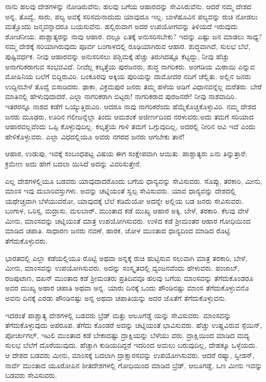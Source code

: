 ನಾನು ಹಲವು ದೇಶಗಳನ್ನು ನೋಡಿರುವೆನು; ಹಲವು ಬಗೆಯ ಆಹಾರವನ್ನು ಸೇವಿಸಿರುವೆನು. ಆದರೆ ನಮ್ಮ ದೇಶದ ಅನ್ನ, ತೊವ್ವೆ, ಸಾರು, ಪಲ್ಯ ಅವಕ್ಕೆ ಸರಿಸಮನಾದುದು ಯಾವುದೂ ಇಲ್ಲ. ಬಾಳೆಹೂವಿನ ಪಲ್ಯವನ್ನು ರುಚಿ ನೋಡಲು ಮತ್ತೊಂದು ಜನ್ಮವನ್ನಾದರೂ ಬಯಸುವೆನು. ಹಲ್ಲಿರುವಾಗ ಅದರ ಉಪಯೋಗವನ್ನು ತಿಳಿಯದೆ ಇರುವುದು ಶೋಚನೀಯ. ಪಾಶ್ಚಾತ್ಯರನ್ನು ನಾವು ಆಹಾರ. ದಲ್ಲೂ ಏತಕ್ಕೆ ಅನುಸರಿಸಬೇಕು? ಇದನ್ನು ಎಷ್ಟು ಜನ ಮಾಡಲು ಸಾಧ್ಯ? ನಮ್ಮ ದೇಶಕ್ಕೆ ಸರಿಯಾಗಿರುವುದು ಪೂರ್ವ ಬಂಗಾಳದಲ್ಲಿ ರೂಢಿಯಾಗಿರುವ ಆಹಾರ. ಶುದ್ಧವಾಗಿದೆ, ಸುಲಭ ಬೆಲೆ, ಪುಷ್ಟಿವರ್ಧಕ. ನೀವು ಆಹಾರವನ್ನು ಅನುಸರಿಸಲು ಪಶ್ಚಿಮಕ್ಕೆ ಹೆಚ್ಚು ತಿರುಗಿದಷ್ಟೂ ಕೆಟ್ಟದ್ದು, ನೀವು ಹೆಚ್ಚು ಅನಾಗರಿಕರಾಗುವ ಸಂಭವವಿದೆ. ನೀವೆಲ್ಲ ಕಲ್ಕತ್ತೆಯ ಪುರಜನರು, ಶುದ್ಧ ನಾಗರಿಕರು. ಅಂಗಡಿಯ ಮಿಠಾಯಿ ಎನ್ನುವ ಮೋಹಿನಿಯ ಬಲೆಗೆ ಬಿದ್ದಿರುವಿರಿ. ಬಂಕೂರವು ಅಕ್ಕಿಯ ಪುರಿಯನ್ನು ದಾಮೋದರ ನದಿಗೆ ಚೆಲ್ಲಿತು. ಅಲ್ಲಿನ ಜನರು ಉದ್ದಿನಬೇಳೆ ತೊವ್ವೆ ಬಿಸಾಡಿದರು. ಢಾಕಾ, ವಿಕ್ರಮಪುರ ಜನರು ತಮ್ಮ ಹಳೆಯ ಅಡಿಗೆ ವಿಧಾನವನ್ನೆಲ್ಲ ಮರೆತರು. ಬೇರೆ ಮಾತಿನಲ್ಲಿ ಹೇಳುವುದಾದರೆ, ಎಲ್ಲಾ ನಾಗರಿಕರಾಗಿ ಬಿಟ್ಟರು! ನಾಗರಿಕರಾದ ಪುರಜನರೇ! ನೀವು ನಾಶವಾದಿರಿ. ಇತರರನ್ನೂ ನಾಶದ ಕಡೆಗೆ ಒಯ್ಯುತ್ತಿರುವಿರಿ. ಆದರೂ ನಾವು ನಾಗರಿಕರೆಂದು ಹೆಮ್ಮೆಕೊಚ್ಚಿಕೊಳ್ಳುವಿರಿ. ನಮ್ಮ ದೇಶದ ಜನರು ಮೂಢರು, ಊರಿನ ಗಲೀಜನ್ನೆಲ್ಲಾ ತಿಂದು ಆಮಶಂಕೆ ಅಜೀರ್ಣದಿಂದ ನರಳುವರು.ಅದು ತಮಗೆ ಸರಿಯಾದ ಆಹಾರವಲ್ಲವೆಂದು ಒಪ್ಪಿ ಕೊಳ್ಳುವುದಿಲ್ಲ. ಕಲ್ಕತ್ತೆಯ ಗಾಳಿ ತಮಗೆ ಒಗ್ಗುವುದಿಲ್ಲ, ಅದರಲ್ಲಿ ನೀರಿನ ಆವಿ ಇದೆ ಎಂದು ಹೇಳಿಕೊಳ್ಳುವರು. ಎಲ್ಲಾ ವಿಧದಲ್ಲಿಯೂ ಅವರು ನಗರದ ಜನರು ಆಗಬೇಕು ತಾನೆ!

ಆಹಾರ, ಉಡುಪು, ಇವಕ್ಕೆ ಸಂಬಂಧಪಟ್ಟ ವಿಷಯ ಈಗ ಸಂಕ್ಷೇಪವಾಗಿ ಆಯಿತು. ಪಾಶ್ಚಾತ್ಯರು ಏನು ತಿನ್ನುತ್ತಾರೆ; ಕ್ರಮೇಣ ಅದು ಹೇಗೆ ಬದಲಾ ಯಿಸಿದೆ ಅದನ್ನು ವಿವರಿಸುತ್ತೇನೆ.

ಎಲ್ಲ ದೇಶಗಳಲ್ಲಿಯೂ ಬಡವರು ಯಾವುದಾದರೊಂದು ಬಗೆಯ ಧಾನ್ಯವನ್ನು ಸೇವಿಸುವರು. ಸೊಪ್ಪು, ತರಕಾರಿ, ಮೀನು, ಮಾಂಸ ಇವು ದುಬಾರಿವಸ್ತುಗಳು. ಅವನ್ನು ಚಟ್ನಿಯಂತೆ ಸ್ವಲ್ಪ ಸೇವಿಸುವರು. ಯಾವ ಧಾನ್ಯವನ್ನು ದೇಶದಲ್ಲಿ ಯಥೇಚ್ಚವಾಗಿ ಬೆಳೆಯುವರೋ, ಯಾವುದಕ್ಕೆ ಬೆಲೆ ಕಡಿಮೆಯೋ ಅದನ್ನೇ ಅಲ್ಲಿಯ ಬಡ ಜನರು ಸೇವಿಸುವರು. ಬಂಗಾಳ, ಒರಿಸ್ಸ, ಮದ್ರಾಸು, ಮಲಬಾರ್​, ಮುಂತಾದ ಕಡೆ ಮುಖ್ಯ ಆಹಾರ ಅಕ್ಕಿ, ಬೇಳೆ, ತರಕಾರಿ. ಕೆಲವು ವೇಳೆ ಮೀನು, ಮಾಂಸವನ್ನು ಚಟ್ನಿಯಂತೆ ಮಾತ್ರ ಉಪಯೋಗಿಸುವರು. ಉಳಿದ ಕಡೆ ಶ‍್ರೀಮಂತರ ಆಹಾರ ಗೋಧಿಯಿಂದ ಮಾಡಿದ ಚಪಾತಿ. ಸಾಧಾರಣ ಜನರು ನವಣೆ, ಹಾರಕ, ಜೋಳ ಮುಂತಾದ ಧಾನ್ಯದಿಂದ ಮಾಡಿದ ರೊಟ್ಟಿ ತೆಗೆದುಕೊಳ್ಳುವರು.

ಭಾರತದಲ್ಲಿ ಎಲ್ಲಾ ಕಡೆಯಲ್ಲಿಯೂ ರೊಟ್ಟಿ ಅಥವಾ ಅನ್ನಕ್ಕೆ ರುಚಿ ಹುಟ್ಟಿಸುವ ಸಲುವಾಗಿ ಮಾತ್ರ ತರಕಾರಿ, ಬೇಳೆ, ಮೀನು, ಮಾಂಸವನ್ನು ಉಪಯೋಗಿಸುವರು. ಅದನ್ನು ಸಂಸ್ಕೃತದಲ್ಲಿ ವ್ಯಂಜನವೆಂದು ಹೇಳುವರು. ಪಂಜಾಬ್​, ರಜಪುಟಾಣ, ದಖನ್​ ಮುಂತಾದ ಕಡೆ ಶ‍್ರೀಮಂತರು ಪ್ರತಿದಿವವೂ ಹಲವು ಬಗೆಯ ಮಾಂಸವನ್ನು ತೆಗೆದುಕೊಂಡರೂ ಅವರ ಮುಖ್ಯ ಅಹಾರ ಚಪಾತಿ ಅಥವಾ ಅನ್ನ. ಯಾರು ದಿನಕ್ಕೆ ಒಂದು ಪೌಂಡಿನಷ್ಟು ಮಾಂಸ ತೆಗೆದುಕೊಳ್ಳುವನೊ ಅವನು ದಿನಕ್ಕೆ ಎರಡು ಪೌಂಡಿನಷ್ಟು ಅನ್ನ ಅಥವಾ ಚಪಾತಿಯನ್ನು ಅದರ ಜೊತೆಗೆ ತೆಗೆದುಕೊಳ್ಳುವನು.

ಇದರಂತೆ ಪಾಶ್ಚಾತ್ಯ ದೇಶಗಳಲ್ಲಿ ಬಡವರು ಬ್ರೆಡ್​ ಮತ್ತು ಆಲೂಗೆಡ್ಡೆ ಯನ್ನು ಸೇವಿಸುವರು. ಮಾಂಸವನ್ನು ತೆಗೆದುಕೊಳ್ಳುವುದು ಅಪರೂಪ. ತೆಗೆದು ಕೊಂಡರೆ ಅದನ್ನು ಚಟ್ನಿಯಂತೆ ಭಾವಿಸುವರು. ಹೆಚ್ಚು ಉಷ್ಣವಿರುವ ಸ್ಪೆಯಿನ್​, ಪೋರ್ಚುಗಲ್​, ಇಟಲಿ ಮುಂತಾದ ಕಡೆ ಬೇಕಾದಷ್ಟು ದ್ರಾಕ್ಷಿಯನ್ನು ಬೆಳೆಯು ವರು. ದ್ರಾಕ್ಷಿಯಿಂದ ಮಾಡಿದ ಮದ್ಯ ಸುಲಭ ಬೆಲೆಗೆ ದೊರೆಯುವುದು. ಹೆಚ್ಚಾಗಿ ಕುಡಿಯದಿದ್ದರೆ ಇದರಿಂದ ಅಮಲು ಬರುವುದಿಲ್ಲ, ದೇಹಕ್ಕೂ ಒಳ್ಳೆಯದು. ಆ ದೇಶದ ಬಡವರು ಮೀನು, ಮಾಂಸಕ್ಕೆ ಬದಲಾಗಿ ದ್ರಾಕ್ಷಾರಸವನ್ನು ಉಪಯೋಗಿಸುವರು. ಆದರೆ ರಷ್ಯಾ, ಸ್ವೀಡನ್​, ನಾರ್ವೆ ಮುಂತಾದ ಯೂರೋಪಿನ ಶೀತದೇಶಗಳಲ್ಲಿ ಗೋಧಿಯಿಂದ ಮಾಡಿದ ಬ್ರೆಡ್​, ಆಲೂಗಡ್ಡೆ, ಒಣ ಮೀನು ಇವನ್ನು ಬಡವರು ಸೇವಿಸುವರು.

